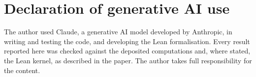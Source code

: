 \section*{Declaration of generative AI use}
The author used Claude, a generative AI model developed by Anthropic, in writing and testing the code, and developing the Lean formalisation. Every result reported here was checked against the deposited computations and, where stated, the Lean kernel, as described in the paper. The author takes full responsibility for the content.

